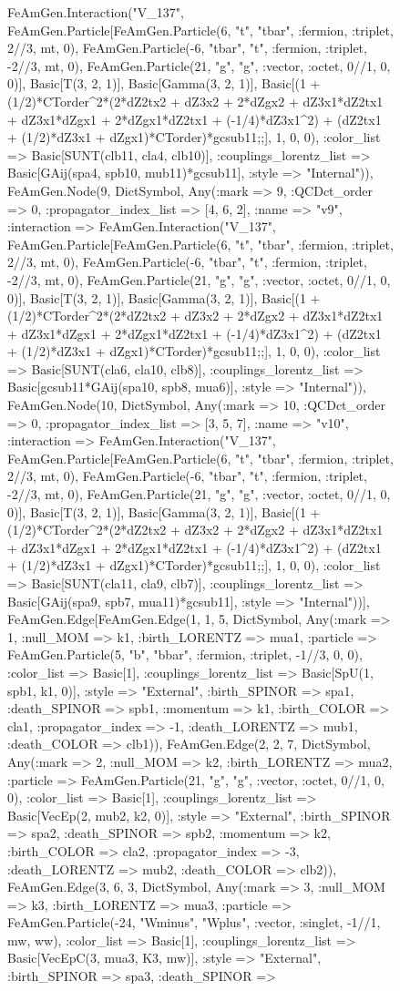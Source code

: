 \documentclass{revtex4}
\begin{document}
\begin{figure}[!htb]
\begin{center}
{FeAmGen.Interaction("V_137", FeAmGen.Particle[FeAmGen.Particle(6, "t", "tbar", :fermion, :triplet, 2//3, mt, 0), FeAmGen.Particle(-6, "tbar", "t", :fermion, :triplet, -2//3, mt, 0), FeAmGen.Particle(21, "g", "g", :vector, :octet, 0//1, 0, 0)], Basic[T(3, 2, 1)], Basic[Gamma(3, 2, 1)], Basic[(1 + (1/2)*CTorder^2*(2*dZ2tx2 + dZ3x2 + 2*dZgx2 + dZ3x1*dZ2tx1 + dZ3x1*dZgx1 + 2*dZgx1*dZ2tx1 + (-1/4)*dZ3x1^2) + (dZ2tx1 + (1/2)*dZ3x1 + dZgx1)*CTorder)*gcsub11;;], 1, 0, 0), :color_list => Basic[SUNT(clb11, cla4, clb10)], :couplings_lorentz_list => Basic[GAij(spa4, spb10, mub11)*gcsub11], :style => "Internal")), FeAmGen.Node(9, Dict{Symbol, Any}(:mark => 9, :QCDct_order => 0, :propagator_index_list => [4, 6, 2], :name => "v9", :interaction => FeAmGen.Interaction("V_137", FeAmGen.Particle[FeAmGen.Particle(6, "t", "tbar", :fermion, :triplet, 2//3, mt, 0), FeAmGen.Particle(-6, "tbar", "t", :fermion, :triplet, -2//3, mt, 0), FeAmGen.Particle(21, "g", "g", :vector, :octet, 0//1, 0, 0)], Basic[T(3, 2, 1)], Basic[Gamma(3, 2, 1)], Basic[(1 + (1/2)*CTorder^2*(2*dZ2tx2 + dZ3x2 + 2*dZgx2 + dZ3x1*dZ2tx1 + dZ3x1*dZgx1 + 2*dZgx1*dZ2tx1 + (-1/4)*dZ3x1^2) + (dZ2tx1 + (1/2)*dZ3x1 + dZgx1)*CTorder)*gcsub11;;], 1, 0, 0), :color_list => Basic[SUNT(cla6, cla10, clb8)], :couplings_lorentz_list => Basic[gcsub11*GAij(spa10, spb8, mua6)], :style => "Internal")), FeAmGen.Node(10, Dict{Symbol, Any}(:mark => 10, :QCDct_order => 0, :propagator_index_list => [3, 5, 7], :name => "v10", :interaction => FeAmGen.Interaction("V_137", FeAmGen.Particle[FeAmGen.Particle(6, "t", "tbar", :fermion, :triplet, 2//3, mt, 0), FeAmGen.Particle(-6, "tbar", "t", :fermion, :triplet, -2//3, mt, 0), FeAmGen.Particle(21, "g", "g", :vector, :octet, 0//1, 0, 0)], Basic[T(3, 2, 1)], Basic[Gamma(3, 2, 1)], Basic[(1 + (1/2)*CTorder^2*(2*dZ2tx2 + dZ3x2 + 2*dZgx2 + dZ3x1*dZ2tx1 + dZ3x1*dZgx1 + 2*dZgx1*dZ2tx1 + (-1/4)*dZ3x1^2) + (dZ2tx1 + (1/2)*dZ3x1 + dZgx1)*CTorder)*gcsub11;;], 1, 0, 0), :color_list => Basic[SUNT(cla11, cla9, clb7)], :couplings_lorentz_list => Basic[GAij(spa9, spb7, mua11)*gcsub11], :style => "Internal"))], FeAmGen.Edge[FeAmGen.Edge(1, 1, 5, Dict{Symbol, Any}(:mark => 1, :null_MOM => k1, :birth_LORENTZ => mua1, :particle => FeAmGen.Particle(5, "b", "bbar", :fermion, :triplet, -1//3, 0, 0), :color_list => Basic[1], :couplings_lorentz_list => Basic[SpU(1, spb1, k1, 0)], :style => "External", :birth_SPINOR => spa1, :death_SPINOR => spb1, :momentum => k1, :birth_COLOR => cla1, :propagator_index => -1, :death_LORENTZ => mub1, :death_COLOR => clb1)), FeAmGen.Edge(2, 2, 7, Dict{Symbol, Any}(:mark => 2, :null_MOM => k2, :birth_LORENTZ => mua2, :particle => FeAmGen.Particle(21, "g", "g", :vector, :octet, 0//1, 0, 0), :color_list => Basic[1], :couplings_lorentz_list => Basic[VecEp(2, mub2, k2, 0)], :style => "External", :birth_SPINOR => spa2, :death_SPINOR => spb2, :momentum => k2, :birth_COLOR => cla2, :propagator_index => -3, :death_LORENTZ => mub2, :death_COLOR => clb2)), FeAmGen.Edge(3, 6, 3, Dict{Symbol, Any}(:mark => 3, :null_MOM => k3, :birth_LORENTZ => mua3, :particle => FeAmGen.Particle(-24, "Wminus", "Wplus", :vector, :singlet, -1//1, mw, ww), :color_list => Basic[1], :couplings_lorentz_list => Basic[VecEpC(3, mua3, K3, mw)], :style => "External", :birth_SPINOR => spa3, :death_SPINOR => }
\end{center}
\end{figure}
\end{document}
